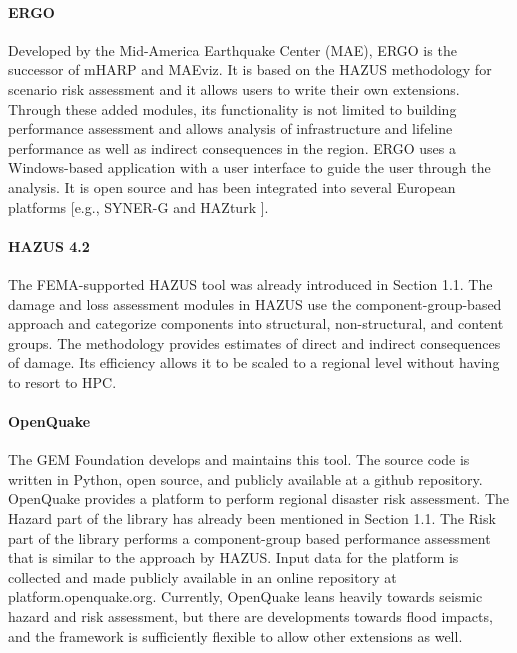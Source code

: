 \paragraph{ERGO} Developed by the Mid-America Earthquake Center (MAE), ERGO is the successor of mHARP and MAEviz. It is based on the HAZUS methodology for scenario risk assessment and it allows users to write their own extensions. Through these added modules, its functionality is not limited to building performance assessment and allows analysis of infrastructure and lifeline performance as well as indirect consequences in the region. ERGO uses a Windows-based application with a user interface to guide the user through the analysis. It is open source and has been integrated into several European platforms [e.g., SYNER-G \citep{pitilakis2014synerg} and HAZturk \citep{karaman2008earthquake}].

\paragraph{HAZUS 4.2} The FEMA-supported HAZUS tool was already introduced in Section 1.1. The damage and loss assessment modules in HAZUS use the component-group-based approach and categorize components into structural, non-structural, and content groups. The methodology provides estimates of direct and indirect consequences of damage. Its efficiency allows it to be scaled to a regional level without having to resort to HPC.

\paragraph{OpenQuake} The GEM Foundation develops and maintains this tool. The source code is written in Python, open source, and publicly available at a github repository. OpenQuake provides a platform to perform regional disaster risk assessment. The Hazard part of the library has already been mentioned in Section 1.1. The Risk part of the library performs a component-group based performance assessment that is similar to the approach by HAZUS. Input data for the platform is collected and made publicly available in an online repository at platform.openquake.org. Currently, OpenQuake leans heavily towards seismic hazard and risk assessment, but there are developments towards flood impacts, and the framework is sufficiently flexible to allow other extensions as well.

